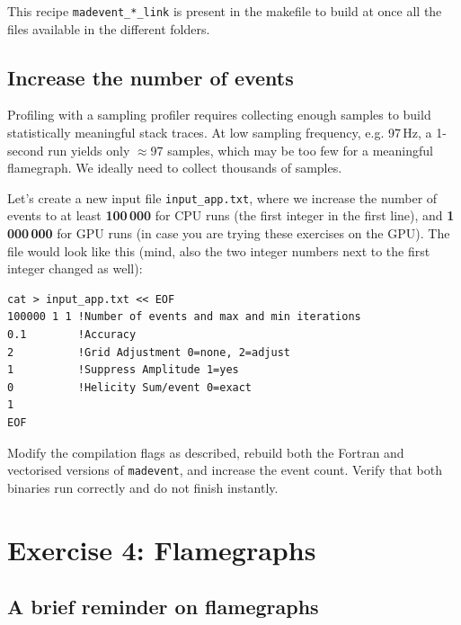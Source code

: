 \documentclass[11pt,a4paper]{article}
\begin{document}
This recipe \texttt{madevent\_*\_link} is present in the makefile to build at once all the files available in the different folders.

\subsection{Increase the number of events}

Profiling with a sampling profiler requires collecting enough samples to build statistically meaningful stack traces.
At low sampling frequency, e.g. 97\,Hz, a 1-second run yields only $\approx$97 samples, which may be too few for a meaningful flamegraph.
We ideally need to collect thousands of samples.

Let's create a new input file \texttt{input\_app.txt}, where we increase the number of events to at least \textbf{100\,000} for CPU runs (the first integer in the first line), and \textbf{1\,000\,000} for GPU runs (in case you are trying these exercises on the GPU).
The file would look like this (mind, also the two integer numbers next to the first integer changed as well):

\begin{lstlisting}[style=bashstyle]
cat > input_app.txt << EOF
100000 1 1 !Number of events and max and min iterations
0.1        !Accuracy
2          !Grid Adjustment 0=none, 2=adjust
1          !Suppress Amplitude 1=yes
0          !Helicity Sum/event 0=exact
1
EOF
\end{lstlisting}

\begin{exercisebox}[Exercise 3]
Modify the compilation flags as described, rebuild both the Fortran and vectorised versions of \texttt{madevent}, and increase the event count.
Verify that both binaries run correctly and do not finish instantly.
\end{exercisebox}

\section{Exercise 4: Flamegraphs}
\label{sec:flamegraphs}

\subsection{A brief reminder on flamegraphs}
\end{document}
